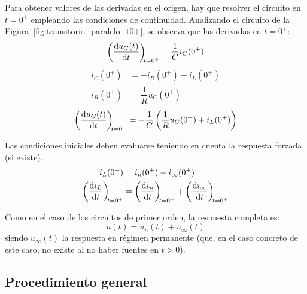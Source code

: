 Para obtener valores de las derivadas en el origen, hay que resolver
el circuito en \(t = 0^+\) empleando las condiciones de
continuidad. Analizando el circuito de la
Figura~\ref{fig.transitorio_paralelo_t0+}, se observa que las
derivadas en $t=0^+$:
\[
  \diff{u_C(t)}{t}[t = 0^+] = \frac{1}{C} i_C(0^+)
\]
\begin{align*}
  i_C(0^+) &= -i_R(0^+) - i_L(0^+)\\
  i_R(0^+) &= \dfrac{1}{R} u_C(0^+)
\end{align*}
\[ {\diff{u_C(t)}{t}[t = 0^+] = - \frac{1}{C}\left(\frac{1}{R}
      u_C(0^+) + i_L(0^+)\right)}
\]
\begin{remark}
  Las condiciones iniciales deben evaluarse teniendo en cuenta la
  respuesta forzada (si existe).
  \begin{align*}
    i_L(0^+) &= i_n(0^+) + i_{\infty}(0^+)\\
    \diff{i_L}{t}[t = 0^+] &= \diff{i_n}{t}[t = 0^+] + \diff{i_{\infty}}{t}[t = 0^+]  
  \end{align*}
\end{remark}
Como en el caso de los circuitos de primer orden, la respuesta
completa es:
\begin{equation*}
  u(t)=u_n(t)+u_\infty(t)
\end{equation*}
siendo $u_\infty(t)$ la respuesta en régimen permanente (que, en el
caso concreto de este caso, no existe al no haber fuentes en $t>0$).
	
\subsection{Procedimiento general}
	
